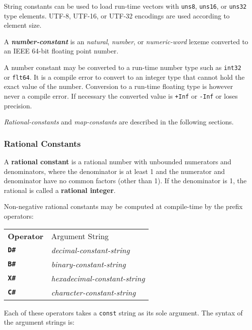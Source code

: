 \documentclass[12pt]{article}
\newcommand{\TT}[1]{{\tt \bfseries #1}}
\newcommand{\key}[1]{{\rm \bfseries #1}}
\newcommand{\emkey}[1]{{\em \bfseries #1}}
\begin{document}
String constants can be used to load run-time vectors
with {\tt uns8}, {\tt uns16}, or {\tt uns32} type elements.
UTF-8, UTF-16, or UTF-32 encodings are used according to element
size.

A \emkey{number-constant}\label{NUMBER-CONSTANT}
is an {\em natural}, {\em number},
or {\em numeric-word} lexeme converted to an IEEE 64-bit floating
point number.

A number constant may be converted to a run-time
number type such as {\tt int32} or {\tt flt64}.
It is a compile error to convert to an integer type that cannot
hold the exact value of the number.
Conversion to a run-time floating type is however
never a compile error.  If necessary the converted value is
{\tt +Inf} or {\tt -Inf} or loses precision.

{\em Rational-constants} and {\em map-constants} are described in the
following sections.


\subsubsection{Rational Constants}
\label{RATIONAL-CONSTANTS}

A \key{rational constant} is a rational number with unbounded
numerators and denominators, where the
denominator is at least 1 and the numerator and denominator
have no common factors (other than 1).  If the denominator is 1, the
rational is called a \key{rational integer}.

Non-negative rational constants may be computed at compile-time
by the prefix operators:
\begin{center}
\begin{tabular}{ll}
\bf Operator	& Argument String
\\[1ex]
\TT{D\#}	& {\em decimal-constant-string} \\
\TT{B\#}	& {\em binary-constant-string} \\
\TT{X\#}	& {\em hexadecimal-constant-string} \\
\TT{C\#}	& {\em character-constant-string} \\
\end{tabular}
\end{center}

Each of these operators takes a {\tt const} string as its sole argument.
The syntax of the argument strings is:
\end{document}
